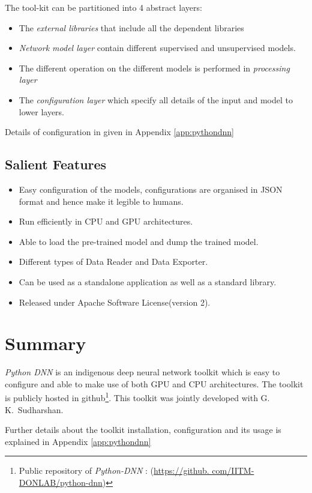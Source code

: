 \noindent The tool-kit can be partitioned into 4 abstract layers:
\begin{itemize}
\item The \textit{external libraries} that include all the dependent libraries
\item \textit{Network model layer} contain different supervised and unsupervised models.
\item The different operation on the different models is performed in \textit{processing layer}
\item The \textit{configuration layer} which specify all details of the input and model to lower layers.
\end{itemize}

Details of configuration in given in Appendix \ref{app:pythondnn}

\subsection{Salient Features}
\label{sec:python-dnnFeatures}
\begin{itemize}
\item Easy configuration of the models, configurations
are organised in JSON format and  hence make it legible to humans.
\item Run efficiently in CPU and GPU architectures.
\item Able to load the pre-trained model and dump the trained model.
\item Different types of Data Reader and Data Exporter.
\item Can be used as a standalone application as well as a standard  library.
\item Released under Apache Software License(version 2).\\
\end{itemize}

\section{Summary}
\textit{Python DNN} is an indigenous deep neural network toolkit which is easy to configure and able to make use of both GPU and CPU architectures. The toolkit is publicly hosted in github\footnote{Public repository of \textit{Python-DNN} : (\url{https://github. com/IITM-DONLAB/python-dnn})}. This toolkit was jointly developed with G.~ K.~Sudharshan.

Further details about the toolkit installation, configuration and its usage is explained in Appendix \ref{app:pythondnn}
